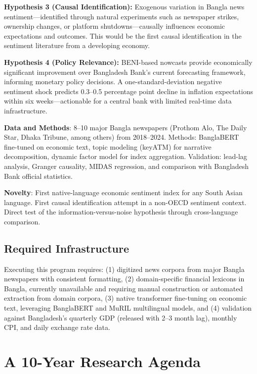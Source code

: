 \documentclass[11pt]{article}
\begin{document}
\hspace*{0.5em}\textbf{Hypothesis 3 (Causal Identification):} Exogenous variation in Bangla news sentiment---identified through natural experiments such as newspaper strikes, ownership changes, or platform shutdowns---causally influences economic expectations and outcomes. This would be the first causal identification in the sentiment literature from a developing economy.

\hspace*{0.5em}\textbf{Hypothesis 4 (Policy Relevance):} BENI-based nowcasts provide economically significant improvement over Bangladesh Bank's current forecasting framework, informing monetary policy decisions. A one-standard-deviation negative sentiment shock predicts 0.3--0.5 percentage point decline in inflation expectations within six weeks---actionable for a central bank with limited real-time data infrastructure.

\noindent\textbf{Data and Methods}: 8--10 major Bangla newspapers (Prothom Alo, The Daily Star, Dhaka Tribune, among others) from 2018--2024. Methods: BanglaBERT fine-tuned on economic text, topic modeling (keyATM) for narrative decomposition, dynamic factor model for index aggregation. Validation: lead-lag analysis, Granger causality, MIDAS regression, and comparison with Bangladesh Bank official statistics.

\noindent\textbf{Novelty}: First native-language economic sentiment index for any South Asian language. First causal identification attempt in a non-OECD sentiment context. Direct test of the information-versus-noise hypothesis through cross-language comparison.

\subsection{Required Infrastructure}

Executing this program requires: (1) digitized news corpora from major Bangla newspapers with consistent formatting, (2) domain-specific financial lexicons in Bangla, currently unavailable and requiring manual construction or automated extraction from domain corpora, (3) native transformer fine-tuning on economic text, leveraging BanglaBERT and MuRIL multilingual models, and (4) validation against Bangladesh's quarterly GDP (released with 2--3 month lag), monthly CPI, and daily exchange rate data.

\section{A 10-Year Research Agenda}
\end{document}
